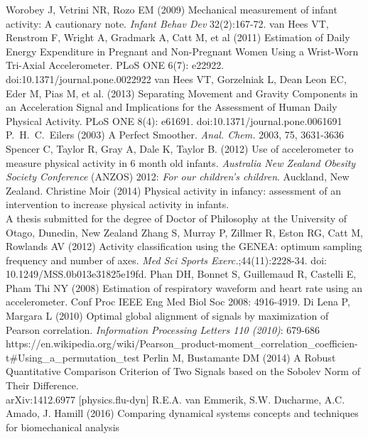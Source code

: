 \documentclass{article}
\begin{document}
\begin{thebibliography}{99} 

Worobey J, Vetrini NR, Rozo EM (2009) Mechanical measurement of infant activity: A cautionary note.
\newblock \textit{Infant Behav Dev} 32(2):167-72.
van Hees VT, Renstrom F, Wright A, Gradmark A, Catt M, et al (2011) Estimation of Daily Energy Expenditure in Pregnant and Non-Pregnant Women
Using a Wrist-Worn Tri-Axial Accelerometer. PLoS ONE 6(7): e22922. doi:10.1371/journal.pone.0022922
van Hees VT, Gorzelniak L, Dean Leon EC, Eder M, Pias M, et al. (2013) Separating Movement and Gravity Components in an Acceleration Signal and
Implications for the Assessment of Human Daily Physical Activity. PLoS ONE 8(4): e61691. doi:10.1371/journal.pone.0061691
P.\ H.\ C.\ Eilers (2003) A Perfect Smoother.
\textit{Anal. Chem.} 2003, 75, 3631-3636
Spencer C, Taylor R, Gray A, Dale K, Taylor B. (2012) Use of accelerometer to measure physical activity in
6 month old infants. \textit{Australia New Zealand Obesity Society Conference} (ANZOS) 2012: \textit{For our
children's children}. Auckland, New Zealand.
Christine Moir (2014) Physical activity in infancy: assessment of an intervention to increase physical activity in infants.\\
A thesis submitted for the degree of Doctor of Philosophy at the University of Otago, Dunedin, New Zealand
Zhang S, Murray P, Zillmer R, Eston RG, Catt M, Rowlands AV (2012) Activity classification using the GENEA: optimum sampling frequency and number of axes.
\newblock \textit{Med Sci Sports Exerc.};44(11):2228-34. doi: 10.1249/MSS.0b013e31825e19fd.
Phan DH, Bonnet S, Guillemaud R, Castelli E, Pham Thi NY (2008) Estimation of respiratory waveform and heart rate using an accelerometer. Conf Proc IEEE
Eng Med Biol Soc 2008: 4916-4919.
Di Lena P, Margara L (2010) Optimal global alignment of signals by maximization of Pearson correlation. 
\textit{Information Processing Letters 110 (2010)}: 679-686
https://en.wikipedia.org/wiki/Pearson\_product-moment\_correlation\_coefficien-
t\#Using\_a\_permutation\_test
Perlin M, Bustamante DM (2014) A Robust Quantitative Comparison Criterion of Two Signals based 
on the Sobolev Norm of Their Difference.\\
arXiv:1412.6977 [physics.flu-dyn]
R.E.A. van Emmerik, S.W. Ducharme, A.C. Amado, J. Hamill (2016) Comparing dynamical systems concepts and techniques for biomechanical analysis\\ 

\end{thebibliography}
\end{document}
